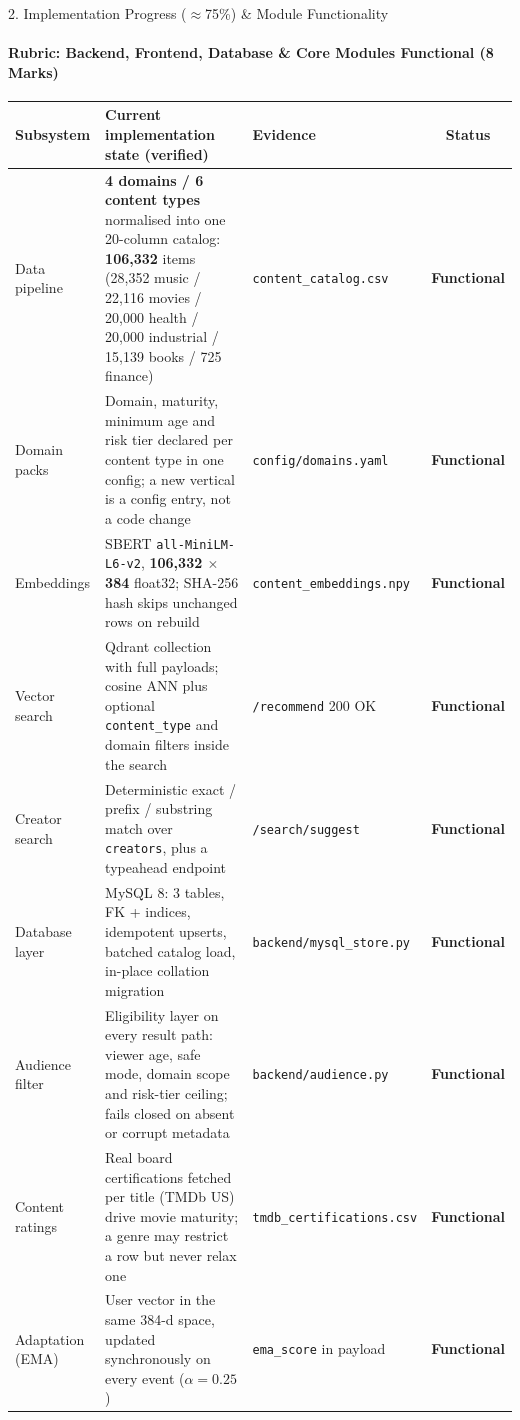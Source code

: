 \documentclass[aspectratio=169, 11pt]{beamer}
\newcommand{\sOK}{\textcolor{amritaTeal}{\textbf{Functional}}}
\begin{document}
\begin{frame}{2. Implementation Progress ($\approx$75\%) \& Module Functionality}
\framesubtitle{Rubric: Backend, Frontend, Database \& Core Modules Functional (8 Marks)}
\vspace{-2mm}
\begin{table}
    \centering
    \tiny
    \renewcommand{\arraystretch}{1.06}
    \begin{tabular}{p{1.95cm} p{6.75cm} p{1.45cm} c}
        \toprule
        \textbf{Subsystem} & \textbf{Current implementation state (verified)} & \textbf{Evidence} & \textbf{Status} \\
        \midrule
        Data pipeline & \textbf{4 domains / 6 content types} normalised into one 20-column catalog: \textbf{106{,}332} items (28{,}352 music / 22{,}116 movies / 20{,}000 health / 20{,}000 industrial / 15{,}139 books / 725 finance) & \texttt{content\_catalog.csv} & \sOK \\
        Domain packs & Domain, maturity, minimum age and risk tier declared per content type in one config; a new vertical is a config entry, not a code change & \texttt{config/domains.yaml} & \sOK \\
        Embeddings & SBERT \texttt{all-MiniLM-L6-v2}, \textbf{106{,}332 $\times$ 384} float32; SHA-256 hash skips unchanged rows on rebuild & \texttt{content\_embeddings.npy} & \sOK \\
        Vector search & Qdrant collection with full payloads; cosine ANN plus optional \texttt{content\_type} and domain filters inside the search & \texttt{/recommend} 200 OK & \sOK \\
        Creator search & Deterministic exact / prefix / substring match over \texttt{creators}, plus a typeahead endpoint & \texttt{/search/suggest} & \sOK \\
        Database layer & MySQL 8: 3 tables, FK + indices, idempotent upserts, batched catalog load, in-place collation migration & \texttt{backend/mysql\_store.py} & \sOK \\
        Audience filter & Eligibility layer on every result path: viewer age, safe mode, domain scope and risk-tier ceiling; fails closed on absent or corrupt metadata & \texttt{backend/audience.py} & \sOK \\
        Content ratings & Real board certifications fetched per title (TMDb US) drive movie maturity; a genre may restrict a row but never relax one & \texttt{tmdb\_certifications.csv} & \sOK \\
        Adaptation (EMA) & User vector in the same 384-d space, updated synchronously on every event ($\alpha{=}0.25$) & \texttt{ema\_score} in payload & \sOK \\

\end{tabular}
\end{table}
\end{frame}
\end{document}
